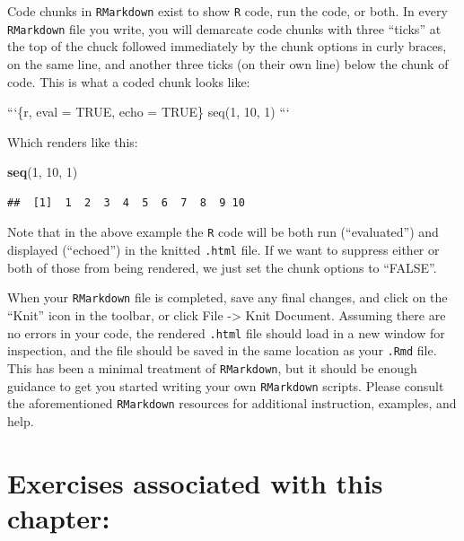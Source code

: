 \documentclass[]{book}
\newenvironment{Shaded}{\begin{snugshade}}{\end{snugshade}}
\newcommand{\BaseNTok}[1]{\textcolor[rgb]{0.00,0.00,0.81}{#1}}
\newcommand{\DecValTok}[1]{\textcolor[rgb]{0.00,0.00,0.81}{#1}}
\newcommand{\KeywordTok}[1]{\textcolor[rgb]{0.13,0.29,0.53}{\textbf{#1}}}
\newcommand{\NormalTok}[1]{#1}
\begin{document}
Code chunks in \texttt{RMarkdown} exist to show \texttt{R} code, run the code, or both. In every \texttt{RMarkdown} file you write, you will demarcate code chunks with three ``ticks'' at the top of the chuck followed immediately by the chunk options in curly braces, on the same line, and another three ticks (on their own line) below the chunk of code. This is what a coded chunk looks like:

\begin{Shaded}
\begin{Highlighting}[]
\BaseNTok{```\{r, eval = TRUE, echo = TRUE\}}
\BaseNTok{seq(1, 10, 1)}
\BaseNTok{```}
\end{Highlighting}
\end{Shaded}

Which renders like this:

\begin{Shaded}
\begin{Highlighting}[]
\KeywordTok{seq}\NormalTok{(}\DecValTok{1}\NormalTok{, }\DecValTok{10}\NormalTok{, }\DecValTok{1}\NormalTok{)}
\end{Highlighting}
\end{Shaded}

\begin{verbatim}
##  [1]  1  2  3  4  5  6  7  8  9 10
\end{verbatim}

Note that in the above example the \texttt{R} code will be both run (``evaluated'') and displayed (``echoed'') in the knitted \texttt{.html} file. If we want to suppress either or both of those from being rendered, we just set the chunk options to ``FALSE''.

When your \texttt{RMarkdown} file is completed, save any final changes, and click on the ``Knit'' icon in the toolbar, or click File -\textgreater{} Knit Document. Assuming there are no errors in your code, the rendered \texttt{.html} file should load in a new window for inspection, and the file should be saved in the same location as your \texttt{.Rmd} file. This has been a minimal treatment of \texttt{RMarkdown}, but it should be enough guidance to get you started writing your own \texttt{RMarkdown} scripts. Please consult the aforementioned \texttt{RMarkdown} resources for additional instruction, examples, and help.

\hypertarget{exercises-associated-with-this-chapter-2}{%
\section{Exercises associated with this chapter:}\label{exercises-associated-with-this-chapter-2}}
\end{document}
